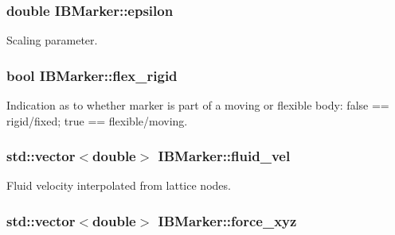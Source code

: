 \subsubsection[{\texorpdfstring{epsilon}{epsilon}}]{\setlength{\rightskip}{0pt plus 5cm}double I\+B\+Marker\+::epsilon\hspace{0.3cm}{\ttfamily [protected]}}\hypertarget{class_i_b_marker_a8127c61f723299ba0bf04439c1fb1c1e}{}\label{class_i_b_marker_a8127c61f723299ba0bf04439c1fb1c1e}


Scaling parameter. 

\subsubsection[{\texorpdfstring{flex\+\_\+rigid}{flex_rigid}}]{\setlength{\rightskip}{0pt plus 5cm}bool I\+B\+Marker\+::flex\+\_\+rigid\hspace{0.3cm}{\ttfamily [protected]}}\hypertarget{class_i_b_marker_a826fd907814ce9c6e40bcbdbd359ec7e}{}\label{class_i_b_marker_a826fd907814ce9c6e40bcbdbd359ec7e}


Indication as to whether marker is part of a moving or flexible body\+: false == rigid/fixed; true == flexible/moving. 

\subsubsection[{\texorpdfstring{fluid\+\_\+vel}{fluid_vel}}]{\setlength{\rightskip}{0pt plus 5cm}std\+::vector$<$double$>$ I\+B\+Marker\+::fluid\+\_\+vel\hspace{0.3cm}{\ttfamily [protected]}}\hypertarget{class_i_b_marker_aa31ccf45de61bfccc60876ac9e98909a}{}\label{class_i_b_marker_aa31ccf45de61bfccc60876ac9e98909a}


Fluid velocity interpolated from lattice nodes. 

\subsubsection[{\texorpdfstring{force\+\_\+xyz}{force_xyz}}]{\setlength{\rightskip}{0pt plus 5cm}std\+::vector$<$double$>$ I\+B\+Marker\+::force\+\_\+xyz\hspace{0.3cm}{\ttfamily [protected]}}\hypertarget{class_i_b_marker_aa8b8b23e64a8bfc4051b95ebf9ccb767}{}\label{class_i_b_marker_aa8b8b23e64a8bfc4051b95ebf9ccb767}


